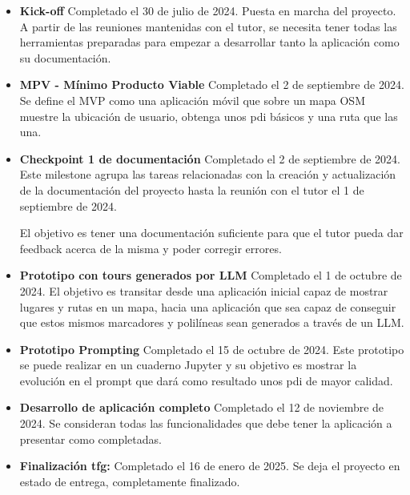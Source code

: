 \begin{itemize}

    \item \textbf{Kick-off} Completado el 30 de julio de 2024. Puesta en marcha del proyecto. A partir de las reuniones mantenidas con el tutor, se necesita tener todas las herramientas preparadas para empezar a desarrollar tanto la aplicación como su documentación.

    \item \textbf{MPV - Mínimo Producto Viable} Completado el 2 de septiembre de 2024. Se define el MVP como una aplicación móvil que sobre un mapa OSM muestre la ubicación de usuario, obtenga unos \acrshort{pdi} básicos y una ruta que las una.

    \item \textbf{Checkpoint 1 de documentación} Completado el 2 de septiembre de 2024. Este milestone agrupa las tareas relacionadas con la creación y actualización de la documentación del proyecto hasta la reunión con el tutor el 1 de septiembre de 2024.

    El objetivo es tener una documentación suficiente para que el tutor pueda dar feedback acerca de la misma y poder corregir errores.

    \item \textbf{Prototipo con tours generados por LLM} Completado el 1 de octubre de 2024. El objetivo es transitar desde una aplicación inicial capaz de mostrar lugares y rutas en un mapa, hacia una aplicación que sea capaz de conseguir que estos mismos marcadores y polilíneas sean generados a través de un LLM. \label{hito:prototipo_llm}

    \item \textbf{Prototipo Prompting} Completado el 15 de octubre de 2024. Este prototipo se puede realizar en un cuaderno Jupyter y su objetivo es mostrar la evolución en el prompt que dará como resultado unos \acrshort{pdi} de mayor calidad.

    \item \textbf{Desarrollo de aplicación completo} Completado el 12 de noviembre de 2024. Se consideran todas las funcionalidades que debe tener la aplicación a presentar como completadas.

    \item \textbf{Finalización \acrshort{tfg}:} Completado el 16 de enero de 2025. Se deja el proyecto en estado de entrega, completamente finalizado.

\end{itemize}

